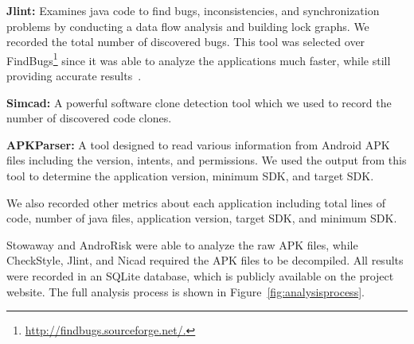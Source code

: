 \documentclass{sig-alternate}
\begin{document}
 \textbf{Jlint:} Examines java code to find bugs, inconsistencies, and synchronization problems by conducting a data flow analysis and building lock graphs. We recorded the total number of discovered bugs. This tool was selected over FindBugs\footnote{\url{http://findbugs.sourceforge.net/.}} since it was able to analyze the applications much faster, while still providing accurate results~\cite{rutar2004comparison}.

 \textbf{Simcad:} A powerful software clone detection tool which we used to record the number of discovered code clones.

 \textbf{APKParser:} A tool designed to read various information from Android APK files including the version, intents, and permissions. We used the output from this tool to determine the application version, minimum SDK, and target SDK.

We also recorded other metrics about each application including total lines of code, number of java files, application version, target SDK, and minimum SDK.


Stowaway and AndroRisk were able to analyze the raw APK files, while CheckStyle, Jlint, and Nicad required the APK files to be decompiled. All results were recorded in an SQLite database, which is publicly available on the project website. The full analysis process is shown in Figure~\ref{fig:analysisprocess}.
\end{document}
